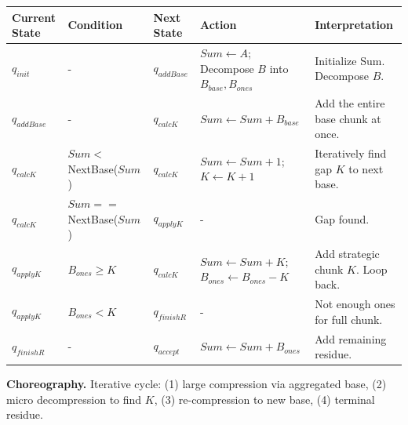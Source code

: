 \documentclass[12pt]{book}
\begin{document}
\begin{longtable}[]{@{}
  >{\raggedright\arraybackslash}p{}
  >{\raggedright\arraybackslash}p{}
  >{\raggedright\arraybackslash}p{}
  >{\raggedright\arraybackslash}p{}
  >{\raggedright\arraybackslash}p{}@{}}
\toprule\noalign{}
\begin{minipage}[b]{\linewidth}\raggedright
Current State
\end{minipage} & \begin{minipage}[b]{\linewidth}\raggedright
Condition
\end{minipage} & \begin{minipage}[b]{\linewidth}\raggedright
Next State
\end{minipage} & \begin{minipage}[b]{\linewidth}\raggedright
Action
\end{minipage} & \begin{minipage}[b]{\linewidth}\raggedright
Interpretation
\end{minipage} \\
\midrule\noalign{}
\endhead
\bottomrule\noalign{}
\endlastfoot
\(q_{init}\) & - & \(q_{addBase}\) & \(Sum \leftarrow A\); Decompose
\(B\) into \(B_{base}, B_{ones}\) & Initialize Sum. Decompose \(B\). \\
\(q_{addBase}\) & - & \(q_{calcK}\) & \(Sum \leftarrow Sum + B_{base}\)
& Add the entire base chunk at once. \\
\(q_{calcK}\) & \(Sum <\) NextBase(\(Sum\)) & \(q_{calcK}\) &
\(Sum \leftarrow Sum + 1\); \(K \leftarrow K + 1\) & Iteratively find
gap \(K\) to next base. \\
\(q_{calcK}\) & \(Sum ==\) NextBase(\(Sum\)) & \(q_{applyK}\) & - & Gap
found. \\
\(q_{applyK}\) & \(B_{ones} \ge K\) & \(q_{calcK}\) &
\(Sum \leftarrow Sum + K\); \(B_{ones} \leftarrow B_{ones} - K\) & Add
strategic chunk \(K\). Loop back. \\
\(q_{applyK}\) & \(B_{ones} < K\) & \(q_{finishR}\) & - & Not enough
ones for full chunk. \\
\(q_{finishR}\) & - & \(q_{accept}\) & \(Sum \leftarrow Sum + B_{ones}\)
& Add remaining residue. \\
\end{longtable}

\textbf{Choreography.} Iterative cycle: (1) large compression via
aggregated base, (2) micro decompression to find \(K\), (3)
re-compression to new base, (4) terminal residue.
\end{document}
